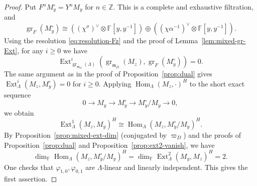 \documentclass[11pt,a4paper]{article} %
\def\FF{\mathbb{F}}
\def\ZZ{\mathbb{Z}}
\def\dim{\operatorname{dim}}
\def\Ext{\operatorname{Ext}} %
\def\gr{\operatorname{gr}}
\def\Hom{\operatorname{Hom}}
\begin{document}
\begin{proof}
    Put $F^nM_y^\circ=Y^nM_y$ for $n\in\ZZ$. This is a complete and exhaustive filtration, and
    \[
    \gr_F(M_y^\circ)\cong\left((\chi^\sigma)^\vee\otimes\FF[y,y^{-1}]\right)\oplus\left((\chi\alpha^{-1})^\vee\otimes\FF[y,y^{-1}]\right).
    \]
    Using the resolution \eqref{eq:resolution-Fz} and the proof of Lemma~\ref{lem:mixed-gr-Ext}, for any $i\ge0$ we have
    \[
    \Ext_{\gr_{\mathfrak{m}_D}(\Lambda)}^i\left(\gr_{\mathfrak{m}_D}(M_z),\gr_F(M_y^\circ)\right)=0.
    \]
    The same argument as in the proof of Proposition~\ref{prop:dual} gives $\Ext^i_{\Lambda}(M_z,M_y^\circ)=0$ for $i\ge0$. Applying $\Hom_{\Lambda}(M_z,\cdot)^H$ to the short exact sequence
    \[
    0\longrightarrow M_y\longrightarrow M_y^\circ\longrightarrow M_y^\circ/M_y\longrightarrow0,
    \]
    we obtain 
    \[   
    \Ext^1_{\Lambda}(M_z,M_y)^H\cong\Hom_{\Lambda}(M_z,M_y^\circ/M_y)^H.
    \]
    By Proposition~\ref{prop:mixed-ext-dim} (conjugated by $\varpi_D$) and the proofs of Proposition~\ref{prop:dual} and Proposition~\ref{prop:ext2-vanish}, we have
    \[
    \dim_\FF\Hom_{\Lambda}(M_z,M_y^\circ/M_y)^H=\dim_\FF\Ext^2_{\Lambda}(M_y,M_z)^H=2.
    \]
    One checks that $\varphi_{1,0},\varphi_{0,1}$ are $\Lambda$-linear and linearly independent. This gives the first assertion.


\end{proof}
\end{document}
